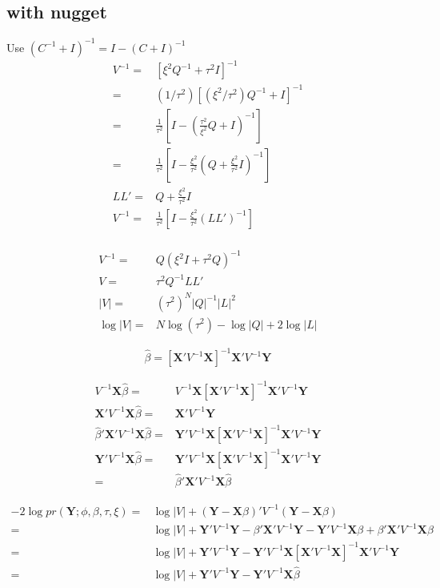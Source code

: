 \documentclass[12pt]{article}
\begin{document}
\subsection*{with nugget}

Use $(C^{-1} + I)^{-1} = I-(C+I)^{-1}$ 
\begin{align*}
V^{-1} = &[\xi^2 Q^{-1} + \tau^2 I]^{-1}\\
=& (1/\tau^2)  [(\xi^2/\tau^2)Q^{-1} + I]^{-1}\\
 = & \frac{1}{\tau^2} \left[ I -   \left(\frac{\tau^2 }{\xi^2} Q +    I\right)^{-1}  \right]\\
 = & \frac{1}{\tau^2} \left[ I -  \frac{\xi^2 }{\tau^2} \left(Q +  \frac{\xi^2 }{\tau^2}  I\right)^{-1}  \right]\\
L L'= &  Q +  \frac{\xi^2 }{\tau^2}  I\\
V^{-1} =& \frac{1}{\tau^2} \left[ I -  \frac{\xi^2 }{\tau^2}\left(L L'  \right)^{-1}  \right]\\
\end{align*}

\begin{align*}
V^{-1} =& Q (\xi^2 I + \tau^2 Q)^{-1}\\
V = & \tau^2 Q^{-1} L L'\\
|V| = &(\tau^2)^N |Q|^{-1} |L|^2\\
\log|V| = & N \log(\tau^2) - \log |Q| + 2 \log |L|
\end{align*}

\[
\hat\beta = [ \mathbf{X}'
 V^{-1}   \mathbf{X}]^{-1}
\mathbf{X}'V^{-1} \mathbf{Y}
\]

\begin{align*}
V^{-1} \mathbf{X} \hat\beta =& 
V^{-1} \mathbf{X} [ \mathbf{X}' V^{-1}   \mathbf{X}]^{-1}
\mathbf{X}' V^{-1} \mathbf{Y}\\
\mathbf{X}' V^{-1} \mathbf{X}  \hat\beta= &\mathbf{X}' V^{-1} \mathbf{Y}\\
\hat\beta' \mathbf{X}' V^{-1} \mathbf{X}  \hat\beta = & \mathbf{Y}'  V^{-1}   \mathbf{X}[ \mathbf{X}'
 V^{-1}   \mathbf{X}]^{-1}\mathbf{X}' V^{-1} \mathbf{Y}\\
 \mathbf{Y}' V^{-1} \mathbf{X}  \hat\beta = & \mathbf{Y}'V^{-1} \mathbf{X} [ \mathbf{X}' V^{-1}   \mathbf{X}]^{-1}
\mathbf{X}' V^{-1} \mathbf{Y}\\
= & \hat\beta' \mathbf{X}' V^{-1} \mathbf{X}  \hat\beta
\end{align*}


\begin{align*}
-2 \log pr(\mathbf{Y};\phi,\beta,\tau,\xi) =&
\log| V| + 
( \mathbf{Y} -\mathbf{X}\beta)  '
  V^{-1}
(\mathbf{Y} - \mathbf{X}\beta)\\
=&\log| V| +  \mathbf{Y}' V^{-1} \mathbf{Y} -\beta' \mathbf{X}' V^{-1} \mathbf{Y} - \mathbf{Y}' V^{-1} \mathbf{X}\beta +  \beta'\mathbf{X}'
 V^{-1}   \mathbf{X}\beta
\\
= & \log| V| +
 \mathbf{Y}' V^{-1} \mathbf{Y}  -  \mathbf{Y}'  V^{-1}   \mathbf{X}[ \mathbf{X}'
 V^{-1}   \mathbf{X}]^{-1}\mathbf{X}' V^{-1} \mathbf{Y}\\
= & \log| V| +
 \mathbf{Y}' V^{-1} \mathbf{Y}  -  \mathbf{Y}'  V^{-1}   \mathbf{X}\hat\beta
\end{align*}
\end{document}
